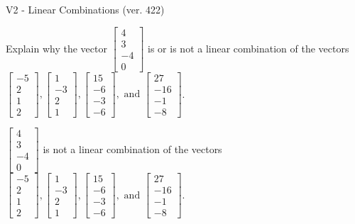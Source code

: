 \begin{exercise}
  \begin{exerciseTitle}V2 - Linear Combinations (ver. 422)\end{exerciseTitle}
  \begin{exerciseStatement}
    Explain why the vector \(\left[\begin{array}{c}
4 \\
3 \\
-4 \\
0
\end{array}\right]\)  is or is not a linear 
	combination of the vectors \(\left[\begin{array}{c}
-5 \\
2 \\
1 \\
2
\end{array}\right] , \left[\begin{array}{c}
1 \\
-3 \\
2 \\
1
\end{array}\right] , \left[\begin{array}{c}
15 \\
-6 \\
-3 \\
-6
\end{array}\right] , \text{ and } \left[\begin{array}{c}
27 \\
-16 \\
-1 \\
-8
\end{array}\right]\).
	


  \end{exerciseStatement}
  \begin{exerciseAnswer}
   \(\left[\begin{array}{c}
4 \\
3 \\
-4 \\
0
\end{array}\right]\) 
  	 is not  
	a linear combination of the vectors \(\left[\begin{array}{c}
-5 \\
2 \\
1 \\
2
\end{array}\right] , \left[\begin{array}{c}
1 \\
-3 \\
2 \\
1
\end{array}\right] , \left[\begin{array}{c}
15 \\
-6 \\
-3 \\
-6
\end{array}\right] , \text{ and } \left[\begin{array}{c}
27 \\
-16 \\
-1 \\
-8
\end{array}\right]\).


\end{exerciseAnswer}
\end{exercise}
